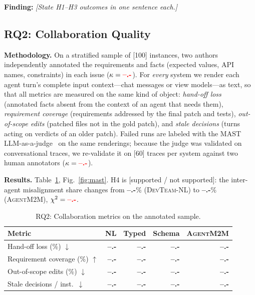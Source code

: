\documentclass[10pt, anonymous, conference]{IEEEtran}
\theoremstyle{definition}
\theoremstyle{plain}
\theoremstyle{remark}
\newcommand{\finding}[1]{\smallskip\noindent\textbf{Finding:} \textit{#1}\smallskip}
\newcommand{\tool}{\textsc{AgentM2M}}
\newcommand{\fixme}[1]{{\color{red}[#1]}}
\newcommand{\ph}{{\color{red}\textbf{--.-}}}     %
\newcommand{\hyp}[1]{{\color{blue}#1}}           %
\begin{document}
\finding{\hyp{[State H1--H3 outcomes in one sentence each.]}}

\subsection{RQ2: Collaboration Quality}\label{subsec:rq2}
\noindent\textbf{Methodology.} On a stratified sample of \fixme{100}
instances, two authors independently annotated the requirements and facts
(expected values, API names, constraints) in each issue ($\kappa=\ph$). For
\emph{every} system we render each agent turn's complete input context---chat
messages or view models---as text, so that all metrics are measured on the same
kind of object: \emph{hand-off loss} (annotated facts absent from the context of
an agent that needs them), \emph{requirement coverage} (requirements addressed
by the final patch and tests), \emph{out-of-scope edits} (patched files not in
the gold patch), and \emph{stale decisions} (turns acting on verdicts of an
older patch). Failed runs are labeled with the MAST
LLM-as-a-judge~\cite{cemri2025mast} on the same renderings; because the judge
was validated on conversational traces, we re-validate it on \fixme{60} traces
per system against two human annotators ($\kappa=\ph$).

\noindent\textbf{Results.} Table~\ref{tab:collab}, Fig.~\ref{fig:mast}.
\hyp{H4 is [supported / not supported]: the inter-agent misalignment share
changes from \ph\% (\textsc{DevTeam-NL}) to \ph\% (\tool{}), $\chi^2=\ph$.}

\begin{table}[t]
\centering
\caption{RQ2: Collaboration metrics on the annotated sample.}
\label{tab:collab}
\footnotesize
\setlength{\tabcolsep}{3pt}
\begin{tabular}{@{}l r r r r@{}}
\toprule
Metric & NL & Typed & Schema & \tool{} \\
\midrule
Hand-off loss (\%) $\downarrow$        & \ph & \ph & \ph & \ph \\
Requirement coverage (\%) $\uparrow$   & \ph & \ph & \ph & \ph \\
Out-of-scope edits (\%) $\downarrow$   & \ph & \ph & \ph & \ph \\
Stale decisions / inst.\ $\downarrow$  & \ph & \ph & \ph & \ph \\
\bottomrule
\end{tabular}
\end{table}
\end{document}
